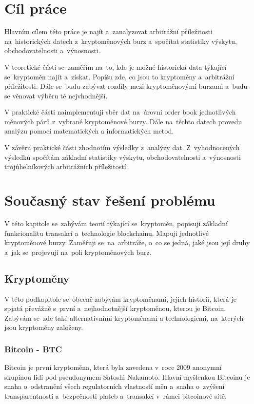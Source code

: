 \documentclass[thesis=B,czech]{FITthesis}[2019/03/21]
\begin{document}
\chapter{Cíl práce}
Hlavním cílem této práce je najít a~zanalyzovat arbitrážní příležitosti na~historických datech z~kryptoměnových burz a~spočítat statistiky výskytu, obchodovatelnosti a~výnosnosti. 

V teoretické části se~zaměřím na~to, kde je možné historická data týkající se~kryptoměn najít a~získat. Popíšu zde, co jsou to kryptoměny a~arbitrážní příležitosti. Dále se~budu zabývat rozdíly mezi kryptoměnovými burzami a~budu se věnovat výběru té nejvhodnější.

V praktické části naimplementuji sběr dat na~úrovni order book jednotlivých měnových párů z~vybrané kryptoměnové burzy. Dále na~těchto datech provedu analýzu pomocí matematických a informatických metod. 

V závěru praktické části zhodnotím výsledky z~analýzy dat. Z~vyhodnocených výsledků spočítám základní statistiky výskytu, obchodovatelnosti a~výnosnosti trojúhelníkových arbitrážních příležitostí. 

\chapter{Současný stav řešení problému}
V této kapitole se~zabývám teorií týkající se~kryptoměn, popisuji základní funkcionalitu transakcí a~technologie blockchainu. Mapuji jednotlivé kryptoměnové burzy. Zaměřuji se~na~arbitráže, o~co se jedná, jaké jsou její druhy a~jak se~projevují na~poli kryptoměnových burz.

\section{Kryptoměny}
V této podkapitole se~obecně zabývám kryptoměnami, jejich historií, která je spjatá převážně s~první a~nejhodnotnější kryptoměnou, kterou je Bitcoin. Zabývám se~zde také alternativními kryptoměnami a technologiemi, na~kterých jsou kryptoměny založeny. \cite{BudoucnostFinTrhu}

\subsection{Bitcoin - BTC}
Bitcoin je první kryptoměna, která byla zavedena v~roce 2009 anonymní skupinou lidí pod pseudonymem Satoshi Nakamoto. Hlavní myšlenkou Bitcoinu je snaha o~odstranění všech regulatorních vlastností měn a~snaha o~zvýšení transparentnosti a~bezpečnosti plateb a~transakcí v~rámci bitcoinové sítě. \cite{Finex}
\end{document}
